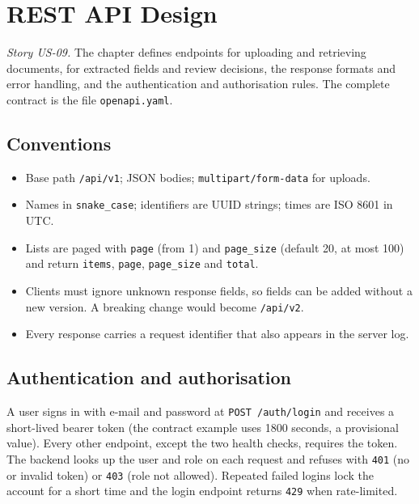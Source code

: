 \documentclass[11pt,a4paper]{report}
\begin{document}
\chapter{REST API Design}\label{ch:p2api}
\emph{Story US-09.} The chapter defines endpoints for uploading and retrieving documents, for extracted fields and review decisions, the response formats and error handling, and the authentication and authorisation rules. The complete contract is the file \texttt{openapi.yaml}.

\section{Conventions}
\begin{itemize}
\item Base path \texttt{/api/v1}; JSON bodies; \texttt{multipart/form-data} for uploads.
\item Names in \texttt{snake\_case}; identifiers are UUID strings; times are ISO 8601 in UTC.
\item Lists are paged with \texttt{page} (from 1) and \texttt{page\_size} (default 20, at most 100) and return \texttt{items}, \texttt{page}, \texttt{page\_size} and \texttt{total}.
\item Clients must ignore unknown response fields, so fields can be added without a new version. A breaking change would become \texttt{/api/v2}.
\item Every response carries a request identifier that also appears in the server log.
\end{itemize}

\section{Authentication and authorisation}
A user signs in with e-mail and password at \texttt{POST /auth/login} and receives a short-lived bearer token (the contract example uses 1800 seconds, a provisional value). Every other endpoint, except the two health checks, requires the token. The backend looks up the user and role on each request and refuses with \texttt{401} (no or invalid token) or \texttt{403} (role not allowed). Repeated failed logins lock the account for a short time and the login endpoint returns \texttt{429} when rate-limited.
\end{document}
